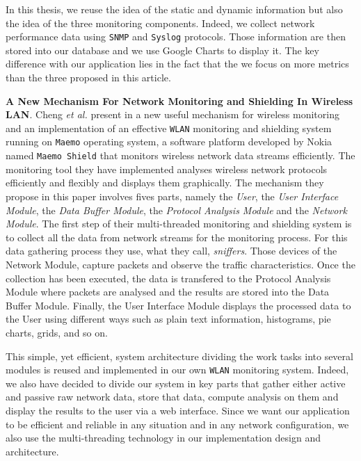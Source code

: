 In this thesis, we reuse the idea of the static and dynamic information but also the idea of the three monitoring components. Indeed, we collect network performance data using \texttt{SNMP} and \texttt{Syslog} protocols. Those information are then stored into our database and we use Google Charts to display it. The key difference with our application lies in the fact that the we focus on more metrics than the three proposed in this article.


\textbf{A New Mechanism For Network Monitoring and Shielding In Wireless LAN}. Cheng \textit{et al.} present in \cite{article2} a new useful mechanism for wireless monitoring and an implementation of an effective \texttt{WLAN} monitoring and shielding system running on \texttt{Maemo} operating system, a software platform developed by Nokia named \texttt{Maemo Shield} that monitors wireless network data streams efficiently. The monitoring tool they have implemented analyses wireless network protocols efficiently and flexibly and displays them graphically. The mechanism they propose in this paper involves fives parts, namely the \textit{User}, the \textit{User Interface Module}, the \textit{Data Buffer Module}, the \textit{Protocol Analysis Module} and the \textit{Network Module}. The first step of their multi-threaded monitoring and shielding system is to collect all the data from network streams for the monitoring process. For this data gathering process they use, what they call, \textit{sniffers}. Those devices of the Network Module, capture packets and observe the traffic characteristics. Once the collection has been executed, the data is transfered to the Protocol Analysis Module where packets are analysed and the results are stored into the Data Buffer Module. Finally, the User Interface Module displays the processed data to the User using different ways such as plain text information, histograms, pie charts, grids, and so on.

This simple, yet efficient, system architecture dividing the work tasks into several modules is reused and implemented in our own \texttt{WLAN} monitoring system. Indeed, we also have decided to divide our system in key parts that gather either active and passive raw network data, store that data, compute analysis on them and display the results to the user via a web interface. Since we want our application to be efficient and reliable in any situation and in any network configuration, we also use the multi-threading technology in our implementation design and architecture.


